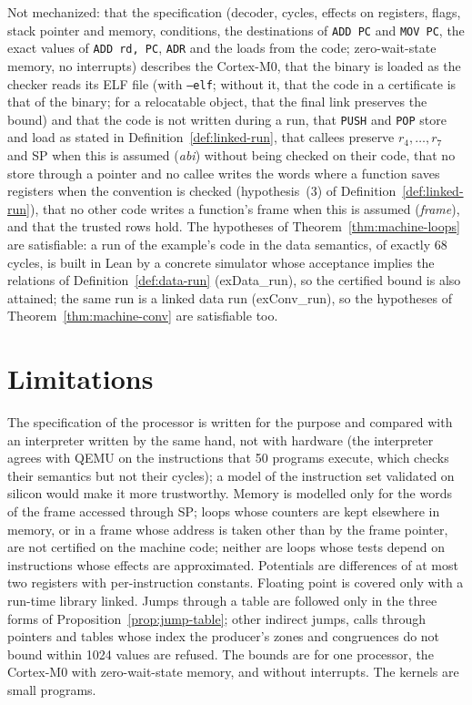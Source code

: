 \documentclass[oneside,english]{amsart}
\numberwithin{equation}{section}
\theoremstyle{plain}
\theoremstyle{definition}
\theoremstyle{plain}
\theoremstyle{plain}
\theoremstyle{remark}
\newcommand{\lean}[1]{{\ttfamily\small #1}}
\begin{document}
Not mechanized: that the specification (decoder, cycles, effects on registers, flags, stack pointer and memory, conditions, the destinations of \texttt{ADD PC} and \texttt{MOV PC}, the exact values of \texttt{ADD rd, PC}, \texttt{ADR} and the loads from the code; zero-wait-state memory, no interrupts) describes the Cortex-M0, that the binary is loaded as the checker reads its ELF file (with \texttt{--elf}; without it, that the code in a certificate is that of the binary; for a relocatable object, that the final link preserves the bound) and that the code is not written during a run, that \texttt{PUSH} and \texttt{POP} store and load as stated in Definition~\ref{def:linked-run}, that callees preserve $r_4, \dots, r_7$ and SP when this is assumed (\emph{abi}) without being checked on their code, that no store through a pointer and no callee writes the words where a function saves registers when the convention is checked (hypothesis~(3) of Definition~\ref{def:linked-run}), that no other code writes a function's frame when this is assumed (\emph{frame}), and that the trusted rows hold. The hypotheses of Theorem~\ref{thm:machine-loops} are satisfiable: a run of the example's code in the data semantics, of exactly 68 cycles, is built in Lean by a concrete simulator whose acceptance implies the relations of Definition~\ref{def:data-run} (\lean{exData\_\allowbreak run}), so the certified bound is also attained; the same run is a linked data run (\lean{exConv\_\allowbreak run}), so the hypotheses of Theorem~\ref{thm:machine-conv} are satisfiable too.

\section{Limitations}
\label{sec:limitations}

The specification of the processor is written for the purpose and compared with an interpreter written by the same hand, not with hardware (the interpreter agrees with QEMU on the instructions that 50 programs execute, which checks their semantics but not their cycles); a model of the instruction set validated on silicon \cite{fox2010trustworthy} would make it more trustworthy. Memory is modelled only for the words of the frame accessed through SP; loops whose counters are kept elsewhere in memory, or in a frame whose address is taken other than by the frame pointer, are not certified on the machine code; neither are loops whose tests depend on instructions whose effects are approximated. Potentials are differences of at most two registers with per-instruction constants. Floating point is covered only with a run-time library linked. Jumps through a table are followed only in the three forms of Proposition~\ref{prop:jump-table}; other indirect jumps, calls through pointers and tables whose index the producer's zones and congruences do not bound within 1024 values are refused. The bounds are for one processor, the Cortex-M0 with zero-wait-state memory, and without interrupts. The kernels are small programs.
\end{document}
